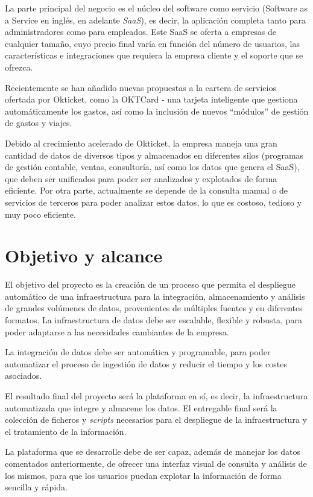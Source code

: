 La parte principal del negocio es el núcleo del software como servicio (Software
as a Service en inglés, en adelante \textit{SaaS}), es decir, la aplicación
completa tanto para administradores como para empleados. Este SaaS se oferta a
empresas de cualquier tamaño, cuyo precio final varía en función del número de
usuarios, las características e integraciones que requiera la empresa cliente y
el soporte que se ofrezca.

Recientemente se han añadido nuevas propuestas a la cartera de servicios
ofertada por Okticket, como la OKTCard {-} una tarjeta inteligente que gestiona
automáticamente los gastos, así como la inclusión de nuevos ``módulos'' de
gestión de gastos y viajes.

Debido al crecimiento acelerado de Okticket, la empresa maneja una gran cantidad
de datos de diversos tipos y almacenados en diferentes silos (programas de
gestión contable, ventas, consultoría, así como los datos que genera el SaaS),
que deben ser unificados para poder ser analizados y explotados de forma eficiente.
Por otra parte, actualmente se depende de la consulta manual o de servicios de
terceros para poder analizar estos datos, lo que es costoso, tedioso y muy
poco eficiente.

\section{Objetivo y alcance}\label{sec:objetivos}
El objetivo del proyecto es la creación de un proceso que permita el despliegue
automático de una infraestructura para la integración, almacenamiento y
análisis de grandes volúmenes de datos, provenientes de múltiples fuentes y en
diferentes formatos. La infraestructura de datos debe ser escalable, flexible y
robusta, para poder adaptarse a las necesidades cambiantes de la empresa.

La integración de datos debe ser automática y programable, para poder
automatizar el proceso de ingestión de datos y reducir el tiempo y los costes
asociados.

El resultado final del proyecto será la plataforma en sí, es decir, la
infraestructura automatizada que integre y almacene los datos. El entregable
final será la colección de ficheros y \textit{scripts} necesarios para el
despliegue de la infraestructura y el tratamiento de la información.

La plataforma que se desarrolle debe de ser capaz, además de manejar los datos
comentados anteriormente, de ofrecer una interfaz visual de consulta y análisis
de los mismos, para que los usuarios puedan explotar la información de forma
sencilla y rápida.
